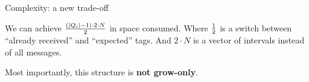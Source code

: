 \documentclass[10pt, xcolor={usenames, dvipsnames}]{beamer}
\begin{document}
\begin{frame}{Complexity: a new trade-off}

  \begin{table}
    \begin{center}
      
    \end{center}
  \end{table}

  \vspace{1em}

  \begin{minipage}{0.48\textwidth}
    \begin{center}
      
    \end{center}
  \end{minipage}\hfill
  \begin{minipage}{0.48\textwidth}
    \begin{center}
      
    \end{center}
  \end{minipage}
  
  \vspace{1em}
  
  We can achieve ${(|Q_i| - 1) \cdot 2\cdot N}\over{2}$ in space consumed. Where
  ${1}\over{2}$ is a switch between ``already received'' and ``expected''
  tags. And $2\cdot N$ is a vector of intervals instead of all messages.
  
  \vspace{1em}

  Most importantly, this structure is \textbf{not grow-only}.

\end{frame}
\end{document}
